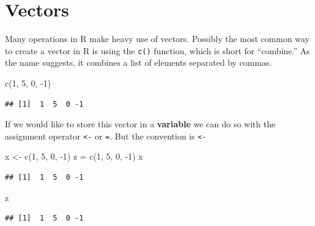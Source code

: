\documentclass[
]{book}
\newenvironment{Shaded}{\begin{snugshade}}{\end{snugshade}}
\newcommand{\DecValTok}[1]{\textcolor[rgb]{0.00,0.00,0.81}{#1}}
\newcommand{\FunctionTok}[1]{\textcolor[rgb]{0.00,0.00,0.00}{#1}}
\newcommand{\NormalTok}[1]{#1}
\newcommand{\OtherTok}[1]{\textcolor[rgb]{0.56,0.35,0.01}{#1}}
\newcommand{\SpecialCharTok}[1]{\textcolor[rgb]{0.00,0.00,0.00}{#1}}
\theoremstyle{definition}
\theoremstyle{definition}
\theoremstyle{definition}
\theoremstyle{definition}
\theoremstyle{remark}
\begin{document}
\hypertarget{vectors}{%
\chapter{Vectors}\label{vectors}}

Many operations in R make heavy use of vectors. Possibly the most common way to create a vector in R is using the \texttt{c()} function, which is short for ``combine.'' As the name suggests, it combines a list of elements separated by commas.

\begin{Shaded}
\begin{Highlighting}[]
\FunctionTok{c}\NormalTok{(}\DecValTok{1}\NormalTok{, }\DecValTok{5}\NormalTok{, }\DecValTok{0}\NormalTok{, }\SpecialCharTok{{-}}\DecValTok{1}\NormalTok{)}
\end{Highlighting}
\end{Shaded}

\begin{verbatim}
## [1]  1  5  0 -1
\end{verbatim}

If we would like to store this vector in a \textbf{variable} we can do so with the assignment operator \texttt{\textless{}-} or \texttt{=}. But the convention is \texttt{\textless{}-}

\begin{Shaded}
\begin{Highlighting}[]
\NormalTok{x }\OtherTok{\textless{}{-}} \FunctionTok{c}\NormalTok{(}\DecValTok{1}\NormalTok{, }\DecValTok{5}\NormalTok{, }\DecValTok{0}\NormalTok{, }\SpecialCharTok{{-}}\DecValTok{1}\NormalTok{)}
\NormalTok{z }\OtherTok{=} \FunctionTok{c}\NormalTok{(}\DecValTok{1}\NormalTok{, }\DecValTok{5}\NormalTok{, }\DecValTok{0}\NormalTok{, }\SpecialCharTok{{-}}\DecValTok{1}\NormalTok{)}
\NormalTok{x}
\end{Highlighting}
\end{Shaded}

\begin{verbatim}
## [1]  1  5  0 -1
\end{verbatim}

\begin{Shaded}
\begin{Highlighting}[]
\NormalTok{z}
\end{Highlighting}
\end{Shaded}

\begin{verbatim}
## [1]  1  5  0 -1
\end{verbatim}
\end{document}
